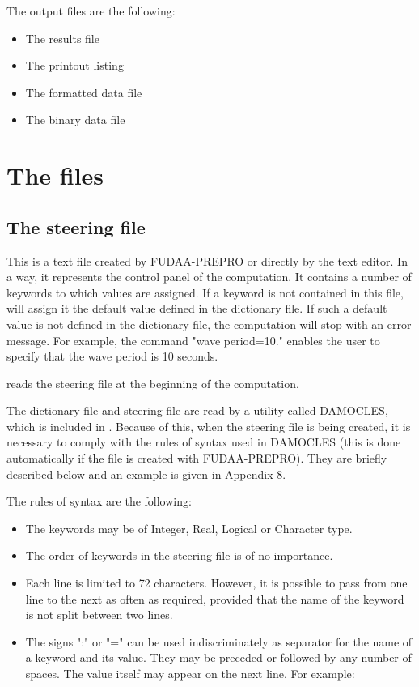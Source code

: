 The output files are the following:

\begin{itemize}
\item  The results file

\item  The printout listing

\item  The formatted data file

\item  The binary data file
\end{itemize}


\section{The files}


\subsection{The steering file}

This is a text file created by FUDAA-PREPRO or directly by the text editor. In
a way, it represents the control panel of the computation. It contains a number
of keywords to which values are assigned. If a keyword is not contained in this
file, \artemis{} will assign it the default value defined in the dictionary
file. If such a default value is
not defined in the dictionary file, the computation will stop with an error
message. For example, the command "wave period=10." enables the user to specify
that the wave period is 10 seconds.

\artemis{} reads the steering file at the beginning of the computation.

The dictionary file and steering file are read by a utility called
DAMOCLES, which is included in \artemis{}\@. Because of this, when
the steering file is being created, it is necessary to comply with
the rules of syntax used in DAMOCLES (this is done automatically if the file is
created with FUDAA-PREPRO). They are briefly described below and an example is
given in Appendix 8.

The rules of syntax are the following:

\begin{itemize}
\item  The keywords may be of Integer, Real, Logical or Character type.

\item  The order of keywords in the steering file is of no importance.

\item  Each line is limited to 72 characters. However, it is possible to pass from one line to the next as often as required, provided that the name of the keyword is not split between two lines.

\item  The signs ":" or "=" can be used indiscriminately as separator for the name of a keyword and its value. They may be preceded or followed by any number of spaces. The value itself may appear on the next line. For example:
\end{itemize}

